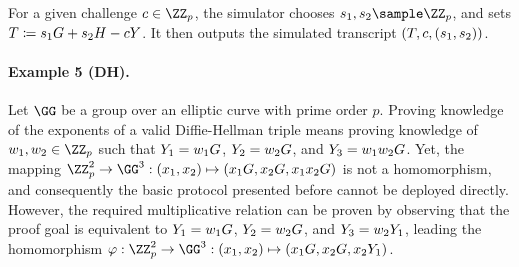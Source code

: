\documentclass[runningheads,11pt]{article}
\begin{document}
For a given challenge $c\in\ZZ_p$, the simulator chooses $s_1,s_2\sample\ZZ_p$, and sets $T\coloneqq s_1G + s_2H -cY$.
It then outputs the simulated transcript $(T,c,(s_1,s_2))$.

\paragraph{Example 5 (DH).}
Let $\GG$ be a group over an elliptic curve with prime order $p$.
Proving knowledge of the exponents of a valid Diffie-Hellman triple means proving knowledge of $w_1,w_2\in\ZZ_p$ such that $Y_1=w_1G$, $Y_2=w_2G$, and $Y_3=w_1 w_2 G$.
Yet, the mapping $\ZZ_p^2\to\GG^3:(x_1,x_2)\mapsto (x_1G,x_2G,x_1x_2G)$ is not a homomorphism, and consequently the basic protocol presented before cannot be deployed directly.
However, the required multiplicative relation can be proven by observing that the proof goal is equivalent to $Y_1=w_1G$, $Y_2=w_2G$, and $Y_3=w_2Y_1$, leading the homomorphism $\varphi:\ZZ_p^2\to\GG^3:(x_1,x_2)\mapsto(x_1G,x_2G,x_2\statement_1)$.
\end{document}
